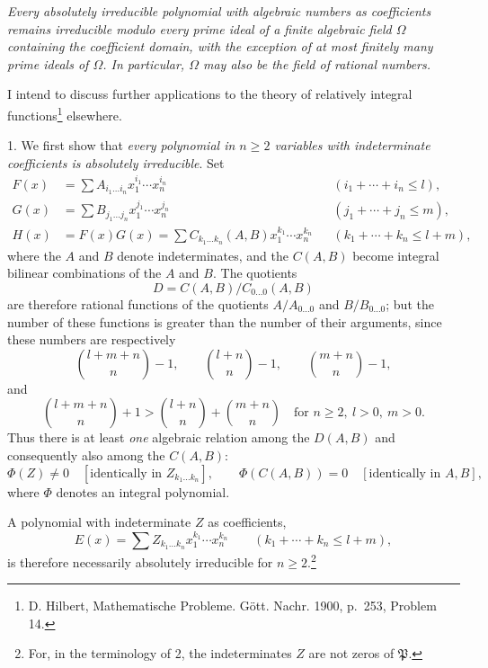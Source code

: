 \documentclass[11pt]{article}
\begin{document}
\emph{Every absolutely irreducible polynomial with algebraic numbers as coefficients remains irreducible modulo every prime ideal of a finite algebraic field $\Omega$ containing the coefficient domain, with the exception of at most finitely many prime ideals of $\Omega$. In particular, $\Omega$ may also be the field of rational numbers.}

I intend to discuss further applications to the theory of relatively integral functions\footnote{D. Hilbert, Mathematische Probleme. Gött. Nachr. 1900, p.~253, Problem 14.} elsewhere.

1. We first show that \emph{every polynomial in $n\ge2$ variables with indeterminate coefficients is absolutely irreducible}. Set
\begin{equation}
\begin{aligned}
F(x)&=\sum A_{i_1\ldots i_n}x_1^{i_1}\cdots x_n^{i_n} &&(i_1+\cdots+i_n\le l),\\
G(x)&=\sum B_{j_1\ldots j_n}x_1^{j_1}\cdots x_n^{j_n} &&(j_1+\cdots+j_n\le m),\\
H(x)&=F(x)G(x)=\sum C_{k_1\ldots k_n}(A,B)x_1^{k_1}\cdots x_n^{k_n} &&(k_1+\cdots+k_n\le l+m),
\end{aligned}
\tag{1}
\end{equation}
where the $A$ and $B$ denote indeterminates, and the $C(A,B)$ become integral bilinear combinations of the $A$ and $B$. The quotients
\[
D=C(A,B)/C_{0\ldots0}(A,B)
\]
are therefore rational functions of the quotients $A/A_{0\ldots0}$ and $B/B_{0\ldots0}$; but the number of these functions is greater than the number of their arguments, since these numbers are respectively
\[
\binom{l+m+n}{n}-1,
\qquad
\binom{l+n}{n}-1,
\qquad
\binom{m+n}{n}-1,
\]
and
\[
\binom{l+m+n}{n}+1>
\binom{l+n}{n}+\binom{m+n}{n}
\quad\text{for } n\ge2,\ l>0,\ m>0.
\]
Thus there is at least \emph{one} algebraic relation among the $D(A,B)$ and consequently also among the $C(A,B)$:
\begin{equation}
 \Phi(Z)\ne0\quad[\text{identically in }Z_{k_1\ldots k_n}],
 \qquad
 \Phi(C(A,B))=0\quad[\text{identically in }A,B],
\tag{2}
\end{equation}
where $\Phi$ denotes an integral polynomial.

A polynomial with indeterminate $Z$ as coefficients,
\begin{equation}
 E(x)=\sum Z_{k_1\ldots k_n}x_1^{k_1}\cdots x_n^{k_n}
 \qquad(k_1+\cdots+k_n\le l+m),
\tag{3}
\end{equation}
is therefore necessarily absolutely irreducible for $n\ge2$.\footnote{For, in the terminology of 2, the indeterminates $Z$ are not zeros of $\mathfrak P$.}
\end{document}
